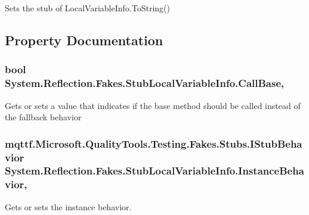 Sets the stub of Local\-Variable\-Info.\-To\-String()



\subsection{Property Documentation}
\hypertarget{class_system_1_1_reflection_1_1_fakes_1_1_stub_local_variable_info_ae62478949c7519a169b51d8c6cd4f92c}{
\subsubsection[{Call\-Base}]{\setlength{\rightskip}{0pt plus 5cm}bool System.\-Reflection.\-Fakes.\-Stub\-Local\-Variable\-Info.\-Call\-Base\hspace{0.3cm}{\ttfamily [get]}, {\ttfamily [set]}}}\label{class_system_1_1_reflection_1_1_fakes_1_1_stub_local_variable_info_ae62478949c7519a169b51d8c6cd4f92c}


Gets or sets a value that indicates if the base method should be called instead of the fallback behavior

\hypertarget{class_system_1_1_reflection_1_1_fakes_1_1_stub_local_variable_info_a5fc9180623a5b34e2becd436aea4bd1b}{
\subsubsection[{Instance\-Behavior}]{\setlength{\rightskip}{0pt plus 5cm}mqttf.\-Microsoft.\-Quality\-Tools.\-Testing.\-Fakes.\-Stubs.\-I\-Stub\-Behavior System.\-Reflection.\-Fakes.\-Stub\-Local\-Variable\-Info.\-Instance\-Behavior\hspace{0.3cm}{\ttfamily [get]}, {\ttfamily [set]}}}\label{class_system_1_1_reflection_1_1_fakes_1_1_stub_local_variable_info_a5fc9180623a5b34e2becd436aea4bd1b}


Gets or sets the instance behavior.

